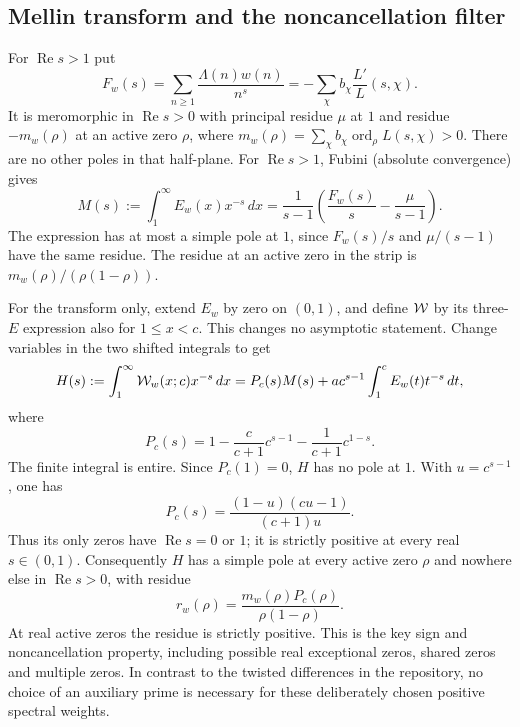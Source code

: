 \documentclass[11pt]{article}
\theoremstyle{remark}\newtheorem{remark}[theorem]{Remark}
\newcommand{\Rea}{\operatorname{Re}}\newcommand{\Ima}{\operatorname{Im}}
\begin{document}
\subsection{Mellin transform and the noncancellation filter}
For $\Rea s>1$ put
\[
 F_w(s)=\sum_{n\ge1}\frac{\Lambda(n)w(n)}{n^s}
       =-\sum_\chi b_\chi\frac{L'}{L}(s,\chi).
\]
It is meromorphic in $\Rea s>0$ with principal residue $\mu$ at $1$ and residue $-m_w(\rho)$ at an active zero $\rho$, where $m_w(\rho)=\sum_\chi b_\chi\operatorname{ord}_\rho L(s,\chi)>0$. There are no other poles in that half-plane. For $\Rea s>1$, Fubini (absolute convergence) gives
\begin{equation}\label{eq:M}
 M(s):=\int_1^\infty E_w(x)x^{-s}\,dx
  =\frac{1}{s-1}\left(\frac{F_w(s)}s-\frac{\mu}{s-1}\right).
\end{equation}
The expression has at most a simple pole at $1$, since $F_w(s)/s$ and $\mu/(s-1)$ have the same residue. The residue at an active zero in the strip is $m_w(\rho)/(\rho(1-\rho))$.

For the transform only, extend $E_w$ by zero on $(0,1)$, and define $\mathcal W$ by its three-$E$ expression also for $1\le x<c$. This changes no asymptotic statement. Change variables in the two shifted integrals to get
\begin{equation}\label{eq:H}
 H(s):=\int_1^\infty\mathcal W_w(x;c)x^{-s}\,dx
 =P_c(s)M(s)+a c^{s-1}\int_1^c E_w(t)t^{-s}\,dt,
\end{equation}
where
\begin{equation}\label{eq:P}
 P_c(s)=1-\frac{c}{c+1}c^{s-1}-\frac{1}{c+1}c^{1-s}.
\end{equation}
The finite integral is entire. Since $P_c(1)=0$, $H$ has no pole at $1$. With $u=c^{s-1}$, one has
\[
 P_c(s)=\frac{(1-u)(cu-1)}{(c+1)u}.
\]
Thus its only zeros have $\Rea s=0$ or $1$; it is strictly positive at every real $s\in(0,1)$. Consequently $H$ has a simple pole at every active zero $\rho$ and nowhere else in $\Rea s>0$, with residue
\begin{equation}\label{eq:res}
 r_w(\rho)=\frac{m_w(\rho)P_c(\rho)}{\rho(1-\rho)}.
\end{equation}
At real active zeros the residue is strictly positive. This is the key sign and noncancellation property, including possible real exceptional zeros, shared zeros and multiple zeros. In contrast to the twisted differences in the repository, no choice of an auxiliary prime is necessary for these deliberately chosen positive spectral weights.
\end{document}
